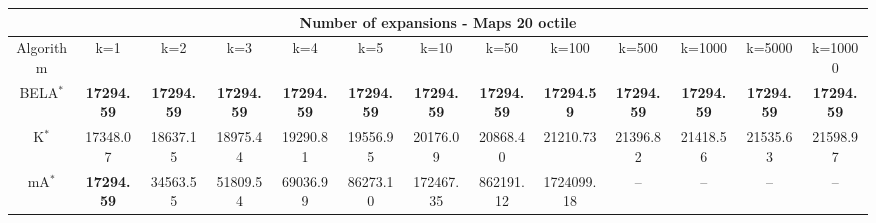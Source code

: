 \begin{tabular}{c|cccccccccccc}\toprule
\multicolumn{13}{c}{Number of expansions - Maps 20 octile}\\ \midrule
Algorithm & k=1 & k=2 & k=3 & k=4 & k=5 & k=10 & k=50 & k=100 & k=500 & k=1000 & k=5000 & k=10000 \\ \midrule
BELA$^*$ & \textbf{17294.59} & \textbf{17294.59} & \textbf{17294.59} & \textbf{17294.59} & \textbf{17294.59} & \textbf{17294.59} & \textbf{17294.59} & \textbf{17294.59} & \textbf{17294.59} & \textbf{17294.59} & \textbf{17294.59} & \textbf{17294.59} \\
K$^*$ & 17348.07 & 18637.15 & 18975.44 & 19290.81 & 19556.95 & 20176.09 & 20868.40 & 21210.73 & 21396.82 & 21418.56 & 21535.63 & 21598.97 \\
mA$^*$ & \textbf{17294.59} & 34563.55 & 51809.54 & 69036.99 & 86273.10 & 172467.35 & 862191.12 & 1724099.18 & -- & -- & -- & -- \\ \bottomrule 
\end{tabular}
